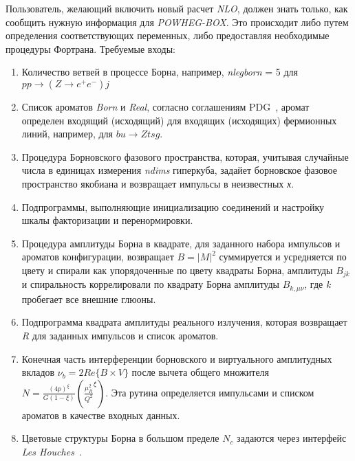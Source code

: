 Пользователь, желающий включить новый расчет \textit{NLO}, должен знать только, как сообщить
нужную информация для \textit{POWHEG-BOX}. Это происходит либо путем определения соответствующих переменных,
либо предоставляя необходимые процедуры Фортрана. Требуемые входы:

\begin{enumerate}
	\item Количество ветвей в процессе Борна, например, \textit{nlegborn} = 5 для $pp \rightarrow (Z \rightarrow {e}^{+}{e}^{-}) j$
	\item Список ароматов \textit{Born} и \textit{Real}, согласно соглашениям PDG~\cite{review-powheg}, аромат
	определен входящий (исходящий) для входящих (исходящих) фермионных линий, например, для $bu \rightarrow Ztsg$.
	\item Процедура Борновского фазового пространства, которая, учитывая случайные числа в единицах измерения \textit{ndims}
	гиперкуба, задайет борновское фазовое пространство якобиана и возвращает импульсы в неизвестных \textit{х}.
	\item Подпрограммы, выполняющие инициализацию соединений и настройку
	шкалы факторизации и перенормировки.
	\item Процедура амплитуды Борна в квадрате, для заданного набора импульсов и ароматов
	конфигурации, возвращает $B = {|M|}^{2}$
	суммируется и усредняется по цвету и спирали
	как упорядоченные по цвету квадраты Борна, амплитуды ${B}_{jk}$ и спиральность коррелировали по квадрату Борна
	амплитуды ${B}_{k,\mu\nu}$, где \textit{k} пробегает все внешние глюоны.
	\item Подпрограмма квадрата амплитуды реального излучения, которая возвращает \textit{R} для заданных импульсов и
	список ароматов.
	\item Конечная часть интерференции борновского и виртуального амплитудных вкладов ${\nu}_{b} = 2Re\{B\times V\}$ после вычета общего множителя $N = \frac{{(4p)}^\xi}{G(1-\xi)}({\frac{{\mu}_{R}^{2}}{{Q}^{2}}}^{\xi})$. Эта рутина определяется импульсами и списком ароматов в качестве входных данных.
	\item Цветовые структуры Борна в большом пределе ${N}_{c}$ задаются через интерфейс \textit{Les Houches}~\cite{review-powheg}.
\end{enumerate}


